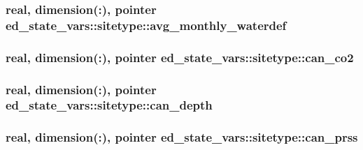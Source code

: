\subsubsection[{\texorpdfstring{avg\+\_\+monthly\+\_\+waterdef}{avg_monthly_waterdef}}]{\setlength{\rightskip}{0pt plus 5cm}real, dimension(\+:), pointer ed\+\_\+state\+\_\+vars\+::sitetype\+::avg\+\_\+monthly\+\_\+waterdef}\hypertarget{structed__state__vars_1_1sitetype_a5255b02af7e041b9d92b04b60c28602c}{}\label{structed__state__vars_1_1sitetype_a5255b02af7e041b9d92b04b60c28602c}
\subsubsection[{\texorpdfstring{can\+\_\+co2}{can_co2}}]{\setlength{\rightskip}{0pt plus 5cm}real, dimension(\+:), pointer ed\+\_\+state\+\_\+vars\+::sitetype\+::can\+\_\+co2}\hypertarget{structed__state__vars_1_1sitetype_a518702f1be4153e5887770c0bf8a32b8}{}\label{structed__state__vars_1_1sitetype_a518702f1be4153e5887770c0bf8a32b8}
\subsubsection[{\texorpdfstring{can\+\_\+depth}{can_depth}}]{\setlength{\rightskip}{0pt plus 5cm}real, dimension(\+:), pointer ed\+\_\+state\+\_\+vars\+::sitetype\+::can\+\_\+depth}\hypertarget{structed__state__vars_1_1sitetype_acad1f4a8f34d5778cf143e010535cc3e}{}\label{structed__state__vars_1_1sitetype_acad1f4a8f34d5778cf143e010535cc3e}
\subsubsection[{\texorpdfstring{can\+\_\+prss}{can_prss}}]{\setlength{\rightskip}{0pt plus 5cm}real, dimension(\+:), pointer ed\+\_\+state\+\_\+vars\+::sitetype\+::can\+\_\+prss}\hypertarget{structed__state__vars_1_1sitetype_a65dc9778e372b1f7b1844b6d996f31be}{}\label{structed__state__vars_1_1sitetype_a65dc9778e372b1f7b1844b6d996f31be}
